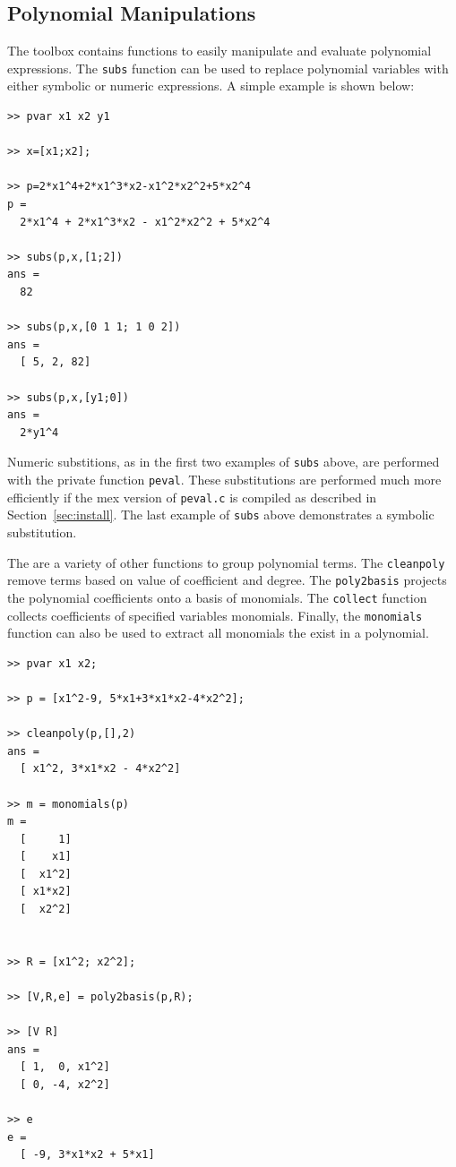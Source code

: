 \documentclass{article}
\begin{document}
\subsection{Polynomial Manipulations}

The toolbox contains functions to easily manipulate and evaluate
polynomial expressions.  The \texttt{subs} function can be used
to replace polynomial variables with either symbolic or numeric
expressions.  A simple example is shown below:

\begin{verbatim}
>> pvar x1 x2 y1

>> x=[x1;x2];

>> p=2*x1^4+2*x1^3*x2-x1^2*x2^2+5*x2^4
p =
  2*x1^4 + 2*x1^3*x2 - x1^2*x2^2 + 5*x2^4

>> subs(p,x,[1;2])
ans =
  82

>> subs(p,x,[0 1 1; 1 0 2])
ans =
  [ 5, 2, 82]

>> subs(p,x,[y1;0])
ans =
  2*y1^4

\end{verbatim}

Numeric substitions, as in the first two examples of \texttt{subs} above,
are performed with the private function \texttt{peval}.  These substitutions
are performed much more efficiently if the mex version of \texttt{peval.c}
is compiled as described in Section~\ref{sec:install}.  The last example
of \texttt{subs} above demonstrates a symbolic substitution.

The are a variety of other functions to group polynomial terms.  The
\texttt{cleanpoly} remove terms based on value of coefficient and
degree. The \texttt{poly2basis} projects the polynomial coefficients
onto a basis of monomials.  The \texttt{collect} function collects
coefficients of specified variables monomials.  Finally, the
\texttt{monomials} function can also be used to extract all monomials
the exist in a polynomial.

\begin{verbatim}
>> pvar x1 x2;

>> p = [x1^2-9, 5*x1+3*x1*x2-4*x2^2];

>> cleanpoly(p,[],2)
ans =
  [ x1^2, 3*x1*x2 - 4*x2^2]

>> m = monomials(p)
m =
  [     1]
  [    x1]
  [  x1^2]
  [ x1*x2]
  [  x2^2]


>> R = [x1^2; x2^2];

>> [V,R,e] = poly2basis(p,R);

>> [V R]
ans =
  [ 1,  0, x1^2]
  [ 0, -4, x2^2]

>> e
e =
  [ -9, 3*x1*x2 + 5*x1]

\end{verbatim}
\end{document}

